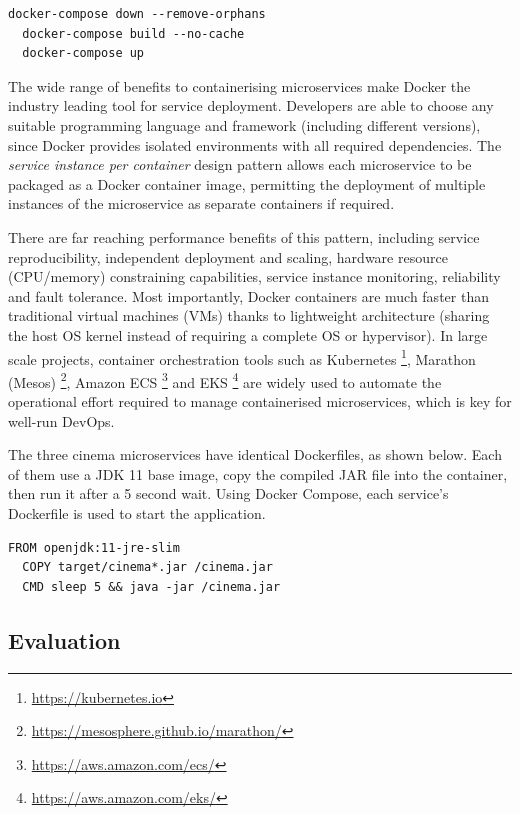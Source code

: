 \begin{lstlisting}[caption=Sample Docker Compose commands to start the microservices]
  docker-compose down --remove-orphans
  docker-compose build --no-cache
  docker-compose up
\end{lstlisting}

The wide range of benefits to containerising microservices make Docker the industry leading tool for service deployment. Developers are able to choose any suitable programming language and framework (including different versions), since Docker provides isolated environments with all required dependencies. The \textit{service instance per container} design pattern allows each microservice to be packaged as a Docker container image, permitting the deployment of multiple instances of the microservice as separate containers if required.

There are far reaching performance benefits of this pattern, including service reproducibility, independent deployment and scaling, hardware resource (CPU/memory) constraining capabilities, service instance monitoring, reliability and fault tolerance. Most importantly, Docker containers are much faster than traditional virtual machines (VMs) thanks to lightweight architecture (sharing the host OS kernel instead of requiring a complete OS or hypervisor). In large scale projects, container orchestration tools such as Kubernetes \footnote{\url{https://kubernetes.io}}, Marathon (Mesos) \footnote{\url{https://mesosphere.github.io/marathon/}}, Amazon ECS \footnote{\url{https://aws.amazon.com/ecs/}} and EKS \footnote{\url{https://aws.amazon.com/eks/}} are widely used to automate the operational effort required to manage containerised microservices, which is key for well-run DevOps.

The three cinema microservices have identical Dockerfiles, as shown below. Each of them use a JDK 11 base image, copy the compiled JAR file into the container, then run it after a 5 second wait. Using Docker Compose, each service's Dockerfile is used to start the application.

\begin{lstlisting}[caption=Dockerfile for cinema services]
  FROM openjdk:11-jre-slim
  COPY target/cinema*.jar /cinema.jar
  CMD sleep 5 && java -jar /cinema.jar
\end{lstlisting}


\subsection{Evaluation}

